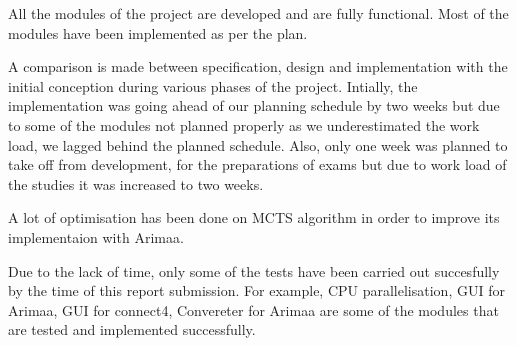 All the modules of the project are developed and are fully functional. Most of the modules have been implemented as per the plan.

A comparison is made between specification, design and implementation with the initial conception during various phases of the project.
Intially, the implementation was going ahead of our planning schedule by two weeks but due to some of the modules not planned properly as we underestimated the work load, we lagged behind the planned schedule. Also, only one week was planned to take off from development, for the preparations of exams but due to work load of the studies it was increased to two weeks.

A lot of optimisation has been done on MCTS algorithm in order to improve its implementaion with Arimaa. 

Due to the lack of time, only some of the tests have been carried out succesfully by the time of this report submission. For example, CPU parallelisation, GUI for Arimaa, GUI for connect4, Convereter for Arimaa are some of the modules that are tested and implemented successfully.